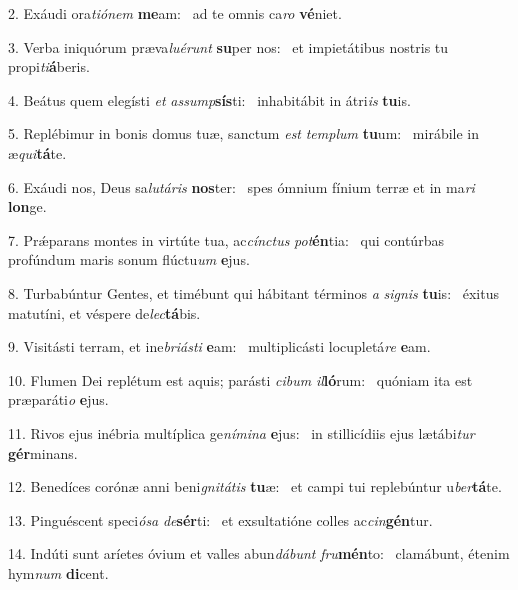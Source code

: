 2. Exáudi ora\textit{ti}\textit{ó}\textit{nem} \textbf{me}am: \ast\  ad te omnis ca\textit{ro} \textbf{vé}niet.\

3. Verba iniquórum præva\textit{lu}\textit{é}\textit{runt} \textbf{su}per nos: \ast\  et impietátibus nostris tu propi\textit{ti}\textbf{á}beris.\

4. Beátus quem elegísti \textit{et} \textit{as}\textit{sump}\textbf{sís}ti: \ast\  inhabitábit in átri\textit{is} \textbf{tu}is.\

5. Replébimur in bonis domus tuæ, sanctum \textit{est} \textit{tem}\textit{plum} \textbf{tu}um: \ast\  mirábile in æ\textit{qui}\textbf{tá}te.\

6. Exáudi nos, Deus sa\textit{lu}\textit{tá}\textit{ris} \textbf{nos}ter: \ast\  spes ómnium fínium terræ et in ma\textit{ri} \textbf{lon}ge.\

7. Prǽparans montes in virtúte tua, ac\textit{cínc}\textit{tus} \textit{pot}\textbf{én}tia: \ast\  qui contúrbas profúndum maris sonum flúctu\textit{um} \textbf{e}jus.\

8. Turbabúntur Gentes, et timébunt qui hábitant términos \textit{a} \textit{si}\textit{gnis} \textbf{tu}is: \ast\  éxitus matutíni, et véspere de\textit{lec}\textbf{tá}bis.\

9. Visitásti terram, et ine\textit{bri}\textit{ás}\textit{ti} \textbf{e}am: \ast\  multiplicásti locupletá\textit{re} \textbf{e}am.\

10. Flumen Dei replétum est aquis; parásti \textit{ci}\textit{bum} \textit{il}\textbf{ló}rum: \ast\  quóniam ita est præparáti\textit{o} \textbf{e}jus.\

11. Rivos ejus inébria multíplica ge\textit{ní}\textit{mi}\textit{na} \textbf{e}jus: \ast\  in stillicídiis ejus lætábi\textit{tur} \textbf{gér}minans.\

12. Benedíces corónæ anni beni\textit{gni}\textit{tá}\textit{tis} \textbf{tu}æ: \ast\  et campi tui replebúntur u\textit{ber}\textbf{tá}te.\

13. Pinguéscent speci\textit{ó}\textit{sa} \textit{de}\textbf{sér}ti: \ast\  et exsultatióne colles ac\textit{cin}\textbf{gén}tur.\

14. Indúti sunt aríetes óvium et valles abun\textit{dá}\textit{bunt} \textit{fru}\textbf{mén}to: \ast\  clamábunt, étenim hym\textit{num} \textbf{di}cent.\

